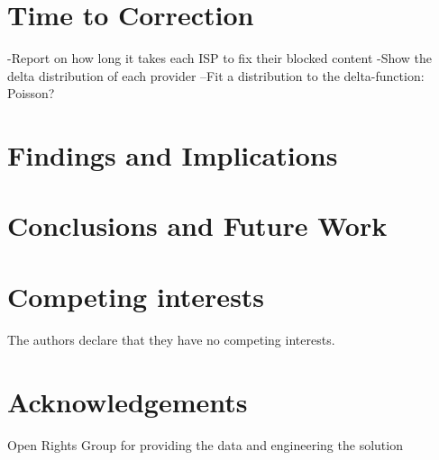 \documentclass{bmcart}
\begin{document}
\clearpage
\section*{Time to Correction}
-Report on how long it takes each ISP to fix their blocked content
-Show the delta distribution of each provider
--Fit a distribution to the delta-function: Poisson?



\section*{Findings and Implications}


\section*{Conclusions and Future Work}








\begin{backmatter}

\section*{Competing interests}
  The authors declare that they have no competing interests.

\section*{Acknowledgements}
Open Rights Group for providing the data and engineering the solution





\end{backmatter}
\end{document}
